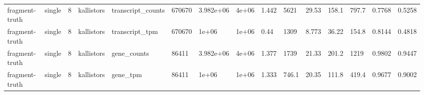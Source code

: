 \begin{tabular}{lllllllllllllll}
fragment-truth & single & 8 & kallistors & transcript\_counts & 670670 & 3.982e+06 & 4e+06 & 1.442 & 5621 & 29.53 & 158.1 & 797.7 & 0.7768 & 0.5258 \\
fragment-truth & single & 8 & kallistors & transcript\_tpm & 670670 & 1e+06 & 1e+06 & 0.44 & 1309 & 8.773 & 36.22 & 154.8 & 0.8144 & 0.4818 \\
fragment-truth & single & 8 & kallistors & gene\_counts & 86411 & 3.982e+06 & 4e+06 & 1.377 & 1739 & 21.33 & 201.2 & 1219 & 0.9802 & 0.9447 \\
fragment-truth & single & 8 & kallistors & gene\_tpm & 86411 & 1e+06 & 1e+06 & 1.333 & 746.1 & 20.35 & 111.8 & 419.4 & 0.9677 & 0.9002 \\
\bottomrule
\end{tabular}

